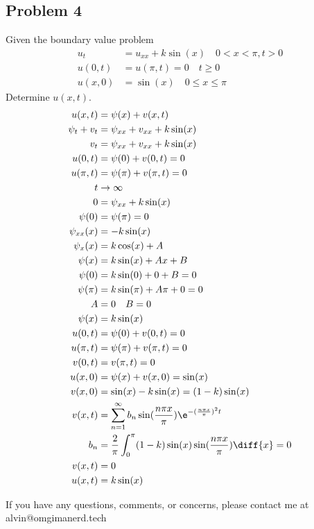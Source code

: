 \documentclass{math}
\begin{document}
\subsection*{Problem 4}
Given the boundary value problem
\begin{align*}
  u_t &= u_{xx}+k\sin(x) \quad 0<x<\pi,t>0 \\
  u(0,t) &= u(\pi,t) = 0 \quad t\ge0 \\
  u(x,0) &= \sin(x) \quad 0\le x\le\pi
\end{align*}
Determine \( u(x,t) \).
\begin{align*}
  u(x,t) &= \psi(x)+v(x,t) \\
  \psi_t+v_t &= \psi_{xx}+v_{xx}+k\sin(x) \\
  v_t &= \psi_{xx}+v_{xx}+k\sin(x) \\
  u(0,t) &= \psi(0)+v(0,t) = 0 \\
  u(\pi,t) &= \psi(\pi)+v(\pi,t) = 0 \\
  t &\to \infty \\
  0 &= \psi_{xx}+k\sin(x) \\
  \psi(0) &= \psi(\pi) = 0 \\
  \psi_{xx}(x) &= -k\sin(x) \\
  \psi_{x}(x) &= k\cos(x)+A \\
  \psi(x) &= k\sin(x)+Ax+B \\
  \psi(0) &= k\sin(0)+0+B = 0 \\
  \psi(\pi) &= k\sin(\pi)+A\pi+0 = 0 \\
  A &= 0 \quad B = 0 \\
  \psi(x) &= k\sin(x) \\
  u(0,t) &= \psi(0)+v(0,t) = 0 \\
  u(\pi,t) &= \psi(\pi)+v(\pi,t) = 0 \\
  v(0,t) &= v(\pi,t) = 0 \\
  u(x,0) &= \psi(x)+v(x,0) = \sin(x) \\
  v(x,0) &= \sin(x)-k\sin(x) = (1-k)\sin(x) \\
  v(x,t) &= \sum_{n=1}^{\infty}
    b_n\sin(\frac{n\pi x}{\pi})\e^{-(\frac{n\pi x}{\pi})^2t} \\
  b_n &= \frac{2}{\pi}\int_{0}^{\pi}
    (1-k)\sin(x)\sin(\frac{n\pi x}{\pi})\diff{x} = 0 \\
  v(x,t) &= 0 \\
  u(x,t) &= k\sin(x)
\end{align*}

\begin{center}
  If you have any questions, comments, or concerns, please contact me at
  alvin@omgimanerd.tech
\end{center}
\end{document}
